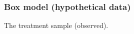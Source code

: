 \documentclass[handout]{beamer}
\begin{document}


   \begin{frame}
   \frametitle{Box model (hypothetical data)}
   \begin{center}
   \end{center}
   The treatment sample (observed).
   \end{frame}
\end{document}
